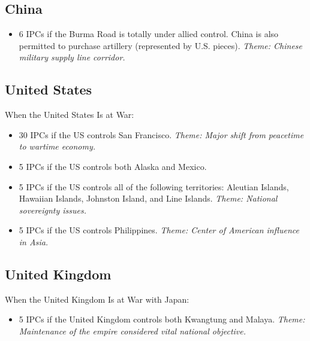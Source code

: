 \documentclass[10pt,a4paper,landscape]{article}
\begin{document}
\begin{multicols*}{3}
\subsection*{China}
\begin{itemize}
\item 6 IPCs if the Burma Road is totally under allied control. China is also permitted to purchase artillery (represented by U.S. pieces). \textsl{Theme: Chinese military supply line corridor.}
\end{itemize}

\subsection*{United States}
When the United States Is at War:
\begin{itemize}
\item 30 IPCs if the US controls San Francisco. \textsl{Theme: Major shift from peacetime to wartime economy.}
\item 5 IPCs if the US controls both Alaska and Mexico.
\item 5 IPCs if the US controls all of the following territories: Aleutian Islands, Hawaiian Islands, Johnston Island, and Line Islands. \textsl{Theme: National sovereignty issues.}
\item 5 IPCs if the US controls Philippines. \textsl{Theme: Center of American influence in Asia.}
\end{itemize}

\subsection*{United Kingdom}
When the United Kingdom Is at War with Japan:
\begin{itemize}
\item 5 IPCs if the United Kingdom controls both Kwangtung
and Malaya. \textsl{Theme: Maintenance of the empire considered vital national objective.}
\end{itemize}

\end{multicols*}
\end{document}
